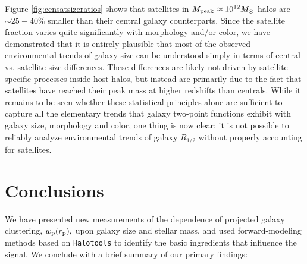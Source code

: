 \documentclass[usenatbib,usegraphicx,letterpaper]{mn2e}
\newcommand{\rhalf}{R_{1/2}}
\newcommand{\mpeak}{M_{\rm peak}}
\newcommand{\rproj}{r_{\rm p}}
\newcommand{\wproj}{w_{\rm p}}
\newcommand{\msun}{M_\odot}
\begin{document}
Figure \ref{fig:censatsizeratios} shows that satellites in $\mpeak\approx10^{12}\msun$ halos are $\sim25-40\%$ smaller than their central galaxy counterparts. Since the satellite fraction varies quite significantly with morphology and/or color, we have demonstrated that it is entirely plausible that most of the observed environmental trends of galaxy size can be understood simply in terms of central vs. satellite size differences. These differences are likely not driven by satellite-specific processes inside host halos, but instead are primarily due to the fact that satellites have reached their peak mass at higher redshifts than centrals. While it remains to be seen whether these statistical principles alone are sufficient to capture all the elementary trends that galaxy two-point functions exhibit with galaxy size, morphology and color, one thing is now clear: it is not possible to reliably analyze environmental trends of galaxy $\rhalf$ without properly accounting for satellites.



\section{Conclusions}
\label{sec:conclusion}

We have presented new measurements of the dependence of projected galaxy clustering, $\wproj(\rproj),$ upon galaxy size and stellar mass, and used forward-modeling methods based on {\tt Halotools} to identify the basic ingredients that influence the signal. We conclude with a brief summary of our primary findings:
\end{document}
